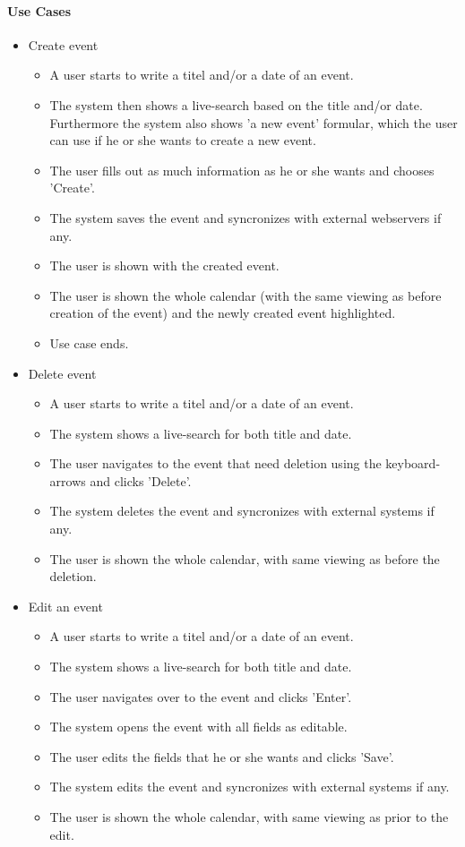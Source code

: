 \documentclass{article}
\begin{document}
   \paragraph{Use Cases}
   \begin{itemize}
   \item Create event
   	\begin{itemize}
   	\item A user starts to write a titel and/or a date of an event. 
   	\item The system then shows a live-search based on the title and/or date. Furthermore the system also shows 'a new event' formular, which the user can use if he or she wants to create a new event.   	
   	\item The user fills out as much information as he or she wants and chooses 'Create'.
   	\item The system saves the event and syncronizes with external webservers if any.
   	\item The user is shown with the created event. 
   	\item The user is shown the whole calendar (with the same viewing as before creation of the event) and the newly created event highlighted. 
   	\item Use case ends.
   	\end{itemize}
   \item Delete event
   \begin{itemize}
   	\item  A user starts to write a titel and/or a date of an event. 
   	\item The system shows a live-search for both title and date. 
   	\item The user navigates to the event that need deletion using the keyboard-arrows and clicks 'Delete'. 
   	\item The system deletes the event and syncronizes with external systems if any.
   	\item The user is shown the whole calendar, with same viewing as before the deletion.
   	\end{itemize}
   \item Edit an event
    \begin{itemize}
   	\item A user starts to write a titel and/or a date of an event.
   	\item The system shows a live-search for both title and date. 
   	\item The user navigates over to the event and clicks 'Enter'. 
   	\item The system opens the event with all fields as editable. 
   	\item The user edits the fields that he or she wants and clicks 'Save'.
   	\item The system edits the event and syncronizes with external systems if any.
   	\item The user is shown the whole calendar, with same viewing as prior to the edit. 
   	\end{itemize}
   

\end{itemize}
\end{document}
